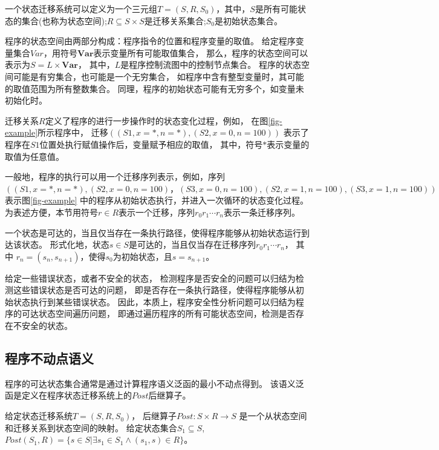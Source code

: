\begin{definition}
一个状态迁移系统可以定义为一个三元组$T=(S, R, S_0)$，其中，$S$是所有可能状态的集合(也称为状态空间);$R \subseteq S \times S $是迁移关系集合;$S_0$是初始状态集合。
\end{definition}


程序的状态空间由两部分构成：程序指令的位置和程序变量的取值。
给定程序变量集合$Var$，用符号$\textbf{Var}$表示变量所有可能取值集合，
那么，程序的状态空间可以表示为$S = L \times \textbf{Var}$，
其中，$L$是程序控制流图中的控制节点集合。
程序的状态空间可能是有穷集合，也可能是一个无穷集合，
如程序中含有整型变量时，其可能的取值范围为所有整数集合。
同理，程序的初始状态可能有无穷多个，如变量未初始化时。

迁移关系$R$定义了程序的进行一步操作时的状态变化过程，例如，
在图\ref{fig-example}所示程序中，
迁移$((S1, x=*, n=*), (S2, x=0, n=100))$
表示了程序在$S1$位置处执行赋值操作后，变量赋予相应的取值，
其中，符号$*$表示变量的取值为任意值。

一般地，程序的执行可以用一个迁移序列表示，例如，序列
$((S1, x=*, n=*), (S2, x=0, n=100)，
(S3, x=0, n=100), (S2, x=1, n=100),
(S3, x=1, n=100) )$表示图\ref{fig-example}
中的程序从初始状态执行，并进入一次循环的状态变化过程。
为表述方便，本节用符号$r\in R$表示一个迁移，序列$r_0 r_1 \cdots r_n$表示一条迁移序列。

一个状态是可达的，当且仅当存在一条执行路径，使得程序能够从初始状态运行到达该状态。
形式化地，状态$s\in S$是可达的，当且仅当存在迁移序列$r_0 r_1 \cdots r_n$，
其中 $r_n = (s_n, s_{n+1})$，使得$s_0$为初始状态，且$s = s_{n+1}$。

给定一些错误状态，或者不安全的状态，
检测程序是否安全的问题可以归结为检测这些错误状态是否可达的问题，
即是否存在一条执行路径，使得程序能够从初始状态执行到某些错误状态。
因此，本质上，程序安全性分析问题可以归结为程序的可达状态空间遍历问题，
即通过遍历程序的所有可能状态空间，检测是否存在不安全的状态。


\subsection{程序不动点语义}

程序的可达状态集合通常是通过计算程序语义泛函的最小不动点得到。
该语义泛函是定义在程序状态迁移系统上的$Post$后继算子。


\begin{definition}
给定状态迁移系统$T=(S,R,S_0)$，
后继算子$Post: S \times R \rightarrow S$
是一个从状态空间和迁移关系到状态空间的映射。
给定状态集合$S_1 \subseteq S$,
$Post(S_1, R) = \{ s\in S | \exists s_1 \in S_1 \wedge (s_1, s)\in R \}$。
\end{definition}

